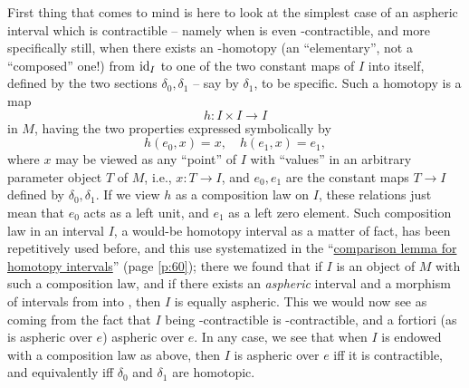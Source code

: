 First thing that comes to mind is here to look at the simplest case of
an aspheric interval \bI{} which is contractible -- namely when \bI{}
is even \bI-contractible, and more specifically still, when there
exists an \bI-homotopy (an ``elementary'', not a ``composed'' one!)
from $\operatorname{id}_I$ to one of the two constant maps of $I$ into itself,
defined by the two sections $\delta_0,\delta_1$ -- say by $\delta_1$,
to be specific. Such a homotopy is a map
\[ h : I\times I\to I\]
in $M$, having the two properties expressed symbolically by
\[ h(e_0,x)=x, \quad h(e_1,x)=e_1,\]
where $x$ may be viewed as any ``point'' of $I$ with ``values'' in an
arbitrary parameter object $T$ of $M$, i.e., $x:T\to I$, and $e_0,e_1$
are the constant maps $T\to I$ defined by $\delta_0,\delta_1$. If we
view $h$ as a composition law on $I$, these relations just mean that
$e_0$ acts as a left unit, and $e_1$ as a left zero element. Such
composition law in an interval $I$, a would-be homotopy interval as a
matter of fact, has been repetitively used before, and this use
systematized in the ``\hyperref[lem:comparisonlemmaforHI]{comparison lemma
  for homotopy intervals}'' (page \ref{p:60}); there we found that if
$I$ is an object of $M$ with such a composition law, and if there
exists an \emph{aspheric} interval \bJ{} and a morphism of intervals
from \bJ{} into \bI, then $I$ is equally aspheric. This we would now
see as coming from the fact that $I$ being \bI-contractible is
\bJ-contractible, and a fortiori (as \bJ{} is aspheric over $e$)
aspheric over $e$. In any case, we see that when $I$ is endowed with a
composition law as above, then $I$ is aspheric over $e$ if{f} it is
contractible, and equivalently if{f} $\delta_0$ and $\delta_1$ are
homotopic.

